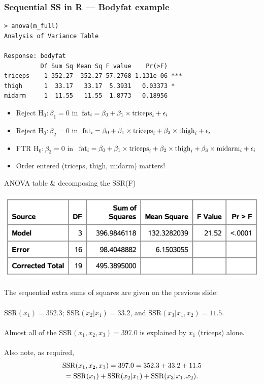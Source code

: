 \documentclass{beamer}
\begin{document}
\begin{frame}[fragile]
\frametitle{Sequential SS in {\sc R} --- Bodyfat example}
\begin{small}
\begin{verbatim}
> anova(m_full)
Analysis of Variance Table

Response: bodyfat
          Df Sum Sq Mean Sq F value    Pr(>F)    
triceps    1 352.27  352.27 57.2768 1.131e-06 ***
thigh      1  33.17   33.17  5.3931   0.03373 *  
midarm     1  11.55   11.55  1.8773   0.18956    
\end{verbatim}

\begin{itemize}
\item<2-> Reject H$_0:\beta_1=0$ in ${\rm fat}_i=\beta_0+\beta_1\times{\rm triceps}_i+\epsilon_i$
\item<3-> Reject H$_0: \beta_2=0$ in ${\rm fat}_i=\beta_0+\beta_1\times{\rm triceps}_i+\beta_2\times{\rm thigh}_i+\epsilon_i$
\item<4-> FTR H$_0:\beta_3=0$ in ${\rm fat}_i=\beta_0+\beta_1\times{\rm triceps}_i+\beta_2\times{\rm thigh}_i+\beta_3\times{\rm midarm}_i+\epsilon_i$
\item<5-> Order entered (triceps, thigh, midarm) matters!
\end{itemize}
\end{small}
\end{frame}

\begin{frame}{ANOVA table \& decomposing the SSR(F)}
\begin{center}
\includegraphics[scale=0.25]{plots/anova}
\end{center}
The sequential extra sums of squares are given on the previous slide:\\~\\
SSR$(x_1) = 352.3$; SSR$(x_2|x_1) = 33.2$, and SSR$(x_3 |x_1 , x_2) = 11.5$.\\~\\

\pause Almost all of the SSR$(x_1 , x_2 , x_3 ) = 397.0$ is explained by $x_1$
(triceps) alone.\\~\\
\pause Also note, as required,
\begin{multline*}
{\rm SSR}(x_1, x_2, x_3) = 397.0 = 352.3+33.2+11.5\\ = {\rm SSR}(x_1)+{\rm SSR}(x_2|x_1)+{\rm SSR}(x_3| x_1, x_2).
\end{multline*}
\end{frame}
\end{document}
